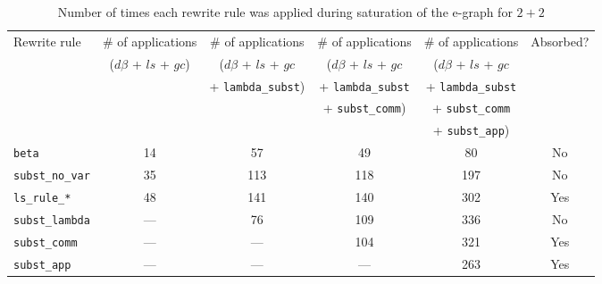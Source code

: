 \begin{table}
	\begin{tabular}{l|ccccc}
		Rewrite rule            & \# of applications       & \# of applications        & \# of applications       & \# of applications       & Absorbed? \\
		                        & ($d\beta$ + $ls$ + $gc$) & ($d\beta$ + $ls$ + $gc$   & ($d\beta$ + $ls$ + $gc$  & ($d\beta$ + $ls$ + $gc$  &           \\
		                        &                          & + \texttt{lambda\_subst}) & + \texttt{lambda\_subst} & + \texttt{lambda\_subst} &           \\
		                        &                          &                           & + \texttt{subst\_comm})  & + \texttt{subst\_comm}   &           \\
		                        &                          &                           &                          & + \texttt{subst\_app})   &           \\
		\hline
		\texttt{beta}           & 14                       & 57                        & 49                       & 80                       & No        \\
		\texttt{subst\_no\_var} & 35                       & 113                       & 118                      & 197                      & No        \\
		\rowcolor{gray!30}
		\texttt{ls\_rule\_*}    & 48                       & 141                       & 140                      & 302                      & Yes       \\
		\texttt{subst\_lambda}  & ---                      & 76                        & 109                      & 336                      & No        \\
		\rowcolor{gray!30}
		\texttt{subst\_comm}    & ---                      & ---                       & 104                      & 321                      & Yes       \\
		\rowcolor{gray!30}
		\texttt{subst\_app}     & ---                      & ---                       & ---                      & 263                      & Yes       \\
	\end{tabular}
	\caption{Number of times each rewrite rule was applied during saturation of the e-graph for $2 + 2$}
	\label{tbl:slotted-rewrite-applications}
\end{table}

